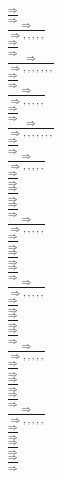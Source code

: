 \documentclass[11pt]{article}
\begin{document}
\begin{center}
\bigskip
\\$\frac{\Rightarrow }{\Rightarrow }$
\bigskip
\\$\frac{\Rightarrow }{\Rightarrow , , , , , }$
\bigskip
\\$\frac{\Rightarrow }{\Rightarrow }$
\bigskip
\\$\frac{\Rightarrow }{\Rightarrow , , , , , , , }$
\bigskip
\\$\frac{\Rightarrow }{\Rightarrow }$
\bigskip
\\$\frac{\Rightarrow }{\Rightarrow , , , , , }$
\bigskip
\\$\frac{\Rightarrow }{\Rightarrow }$
\bigskip
\\$\frac{\Rightarrow }{\Rightarrow , , , , , , , }$
\bigskip
\\$\frac{\Rightarrow }{\Rightarrow }$
\bigskip
\\$\frac{\Rightarrow }{\Rightarrow , , , , , }$
\bigskip
\\$\frac{\Rightarrow }{\Rightarrow }$
\bigskip
\\$\frac{\Rightarrow }{\Rightarrow }$
\bigskip
\\$\frac{\Rightarrow }{\Rightarrow }$
\bigskip
\\$\frac{\Rightarrow }{\Rightarrow , , , , , }$
\bigskip
\\$\frac{\Rightarrow }{\Rightarrow }$
\bigskip
\\$\frac{\Rightarrow }{\Rightarrow }$
\bigskip
\\$\frac{\Rightarrow }{\Rightarrow }$
\bigskip
\\$\frac{\Rightarrow }{\Rightarrow , , , , , }$
\bigskip
\\$\frac{\Rightarrow }{\Rightarrow }$
\bigskip
\\$\frac{\Rightarrow }{\Rightarrow }$
\bigskip
\\$\frac{\Rightarrow }{\Rightarrow }$
\bigskip
\\$\frac{\Rightarrow }{\Rightarrow , , , , , }$
\bigskip
\\$\frac{\Rightarrow }{\Rightarrow }$
\bigskip
\\$\frac{\Rightarrow }{\Rightarrow }$
\bigskip
\\$\frac{\Rightarrow }{\Rightarrow }$
\bigskip
\\$\frac{\Rightarrow }{\Rightarrow , , , , , }$
\bigskip
\\$\frac{\Rightarrow }{\Rightarrow }$
\bigskip
\\$\frac{\Rightarrow }{\Rightarrow }$
\bigskip
\\$\frac{\Rightarrow }{\Rightarrow }$

\end{center}
\end{document}
